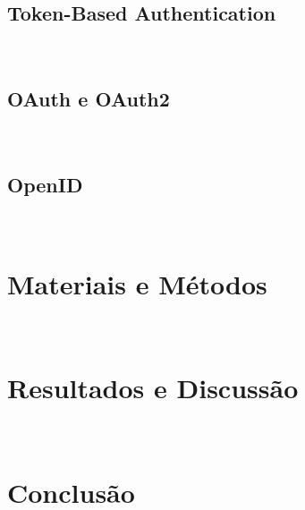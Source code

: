 \documentclass[12pt]{article}
\begin{document}
\subsection{Token-Based Authentication}
\
\subsection{OAuth e OAuth2}
\
\subsection{OpenID}
\
\section{Materiais e Métodos}
\
\section{Resultados e Discussão}
\
\section{Conclusão}
\



\end{document}
